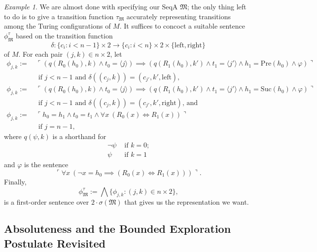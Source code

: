 \documentclass[12pt, twoside]{memoir}
\numberwithin{equation}{section}
\theoremstyle{definition}
\theoremstyle{remark}
\newtheorem{ex}[thm]{Example}
\theoremstyle{definition}
\theoremstyle{definition}
\theoremstyle{definition}
\theoremstyle{remark}
\begin{document}
\begin{ex}
We are almost done with specifying our SeqA $\mathfrak{M}$; the only thing left to do is to give a transition function $\tau_{\mathfrak{M}}$ accurately representing transitions among the Turing configurations of $M$. It suffices to concoct a suitable sentence $\phi^{\tau}_{\mathfrak{M}}$ based on the transition function $$\delta : \{c_i : i < n-1\} \times 2 \longrightarrow \{c_i : i < n\} \times 2 \times \{\mathrm{left}, \mathrm{right}\}$$ of $M$. For each pair $(j, k) \in n \times 2$, let
\begin{align*}
    \phi_{j,k} := \ & \ulcorner (q(R_0(h_0), k) \wedge t_0 \! = \! \langle j \rangle) \!\! \implies \!\! (q(R_1(h_0), k') \wedge t_1 \! = \! \langle j' \rangle \wedge h_1 \! = \mathrm{Pre}(h_0) \wedge \varphi) \urcorner \\ 
    & \text{ if } j < n-1 \text{ and } \delta((c_j, k)) = (c_{j'}, k', \mathrm{left}) \text{,} \\
    \phi_{j,k} := \ & \ulcorner (q(R_0(h_0), k) \wedge t_0 \! = \! \langle j \rangle) \!\! \implies \!\! (q(R_1(h_0), k') \wedge t_1 \! = \! \langle j' \rangle \wedge h_1 \! = \mathrm{Suc}(h_0) \wedge \varphi) \urcorner \\ 
    & \text{ if } j < n-1 \text{ and } \delta((c_j, k)) = (c_{j'}, k', \mathrm{right}) \text{, and} \\
    \phi_{j,k} := \ & \ulcorner h_0 = h_1 \wedge t_0 = t_1 \wedge \forall x \ (R_0(x) \iff R_1(x)) \urcorner \\ 
    & \text{ if } j = n-1 \text{,}
\end{align*}
where $q(\psi, k)$ is a shorthand for 
\begin{align*}
    \neg \psi & \text{ if } k = 0 \text{;} \\
    \psi & \text{ if } k = 1
\end{align*}
and $\varphi$ is the sentence
\begin{equation*}
    \ulcorner \forall x \ (\neg x = h_0 \implies (R_0(x) \iff R_1(x))) \urcorner \text{.}
\end{equation*}
Finally, 
\begin{equation*}
    \phi^{\tau}_{\mathfrak{M}} := \bigwedge \{\phi_{j,k} : (j, k) \in n \times 2\} \text{,}
\end{equation*}
is a first-order sentence over $2 \cdot \sigma(\mathfrak{M})$ that gives us the representation we want.
\end{ex}

\subsection{Absoluteness and the Bounded Exploration Postulate Revisited}\label{ss240}
\end{document}
